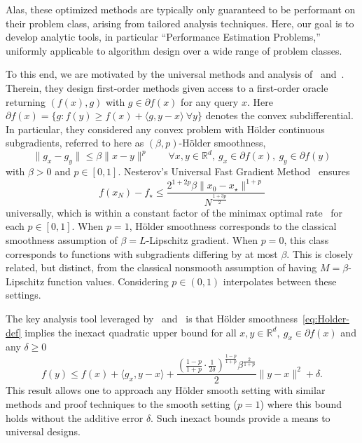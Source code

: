 \documentclass[11pt, hidelinks]{article}
\numberwithin{equation}{section}
\theoremstyle{thmstyletwo}%
\numberwithin{equation}{section}
\newcommand{\R}{\mathbb{R}}
\newcommand{\Holder}{H\"older }
\begin{document}
Alas, these optimized methods are typically only guaranteed to be performant on their problem class, arising from tailored analysis techniques. Here, our goal is to develop analytic tools, in particular ``Performance Estimation Problems,'' uniformly applicable to algorithm design over a wide range of problem classes.


To this end, we are motivated by the universal methods and analysis of~\cite{devolder_inexactly_smooth} and~\cite{Nesterov_2014}. Therein, they design first-order methods given access to a first-order oracle returning $(f(x),g) $ with $g \in\partial f(x)$ for any query $x$. Here $\partial f(x)=\{g : f(y) \geq f(x)+\langle g, y-x\rangle\ \forall y\}$ denotes the convex subdifferential. In particular, they considered any convex problem with \Holder continuous subgradients, referred to here as $(\beta,p)$-\Holder smoothness,
\begin{equation}\label{eq:Holder-def}
    \|g_x - g_y\|\leq \beta\|x-y\|^p \qquad \forall x,y\in\R^d,\ g_x\in\partial f(x),\ g_y\in\partial f(y)
\end{equation}
with $\beta>0$ and $p\in [0,1]$.
Nesterov's Universal Fast Gradient Method~\cite{Nesterov_2014} ensures
\begin{equation}\label{eq:Optimal-Holder-rate}
    f(x_N) - f_\star \leq \frac{2^{1+2p}\beta \|x_0-x_\star\|^{1+p}}{N^{\frac{1+3p}{2}}}
\end{equation}
universally, which is within a constant factor of the minimax optimal rate~\cite{nemierovski_optimal_HS} for each $p\in[0,1]$. When $p=1$, \Holder smoothness corresponds to the classical smoothness assumption of $\beta=L$-Lipschitz gradient. When $p=0$, this class corresponds to functions with subgradients differing by at most $\beta$. This is closely related, but distinct, from the classical nonsmooth assumption of having $M = \beta$-Lipschitz function values. Considering $p\in (0,1)$ interpolates between these settings.

The key analysis tool leveraged by~\cite{devolder_inexactly_smooth} and~\cite{Nesterov_2014} is that \Holder smoothness~\eqref{eq:Holder-def} implies the inexact quadratic upper bound for 
all $x,y \in \R^d,\ g_x\in\partial f(x)$ and any $\delta \geq 0$
\begin{equation}\label{eq:Holder-consequence}
    f(y) \leq f(x) + \langle g_x, y-x\rangle + \frac{\left(\frac{1-p}{1+p}\cdot\frac{1}{2\delta}\right)^\frac{1-p}{1+p}\beta^{\frac{2}{1+p}}}{2}\|y-x\|^2 + \delta.
\end{equation}
This result allows one to approach any \Holder smooth setting with similar methods and proof techniques to the smooth setting ($p=1$) where this bound holds without the additive error $\delta$. Such inexact bounds provide a means to universal designs.
\end{document}
